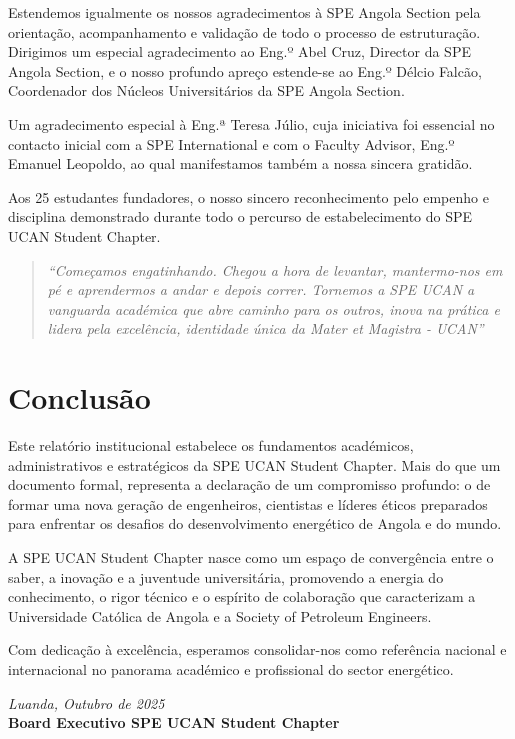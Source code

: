 \documentclass[12pt]{article}
\begin{document}
Estendemos igualmente os nossos agradecimentos à SPE Angola Section pela orientação, acompanhamento e validação de todo o processo de estruturação. Dirigimos um especial agradecimento ao Eng.º Abel Cruz, Director da SPE Angola Section, e o nosso profundo apreço estende-se ao Eng.º Délcio Falcão, Coordenador dos Núcleos Universitários da SPE Angola Section.

Um agradecimento especial à Eng.ª Teresa Júlio, cuja iniciativa foi essencial no contacto inicial com a SPE International e com o Faculty Advisor, Eng.º Emanuel Leopoldo, ao qual manifestamos também a nossa sincera gratidão.

Aos 25 estudantes fundadores, o nosso sincero reconhecimento pelo empenho e disciplina demonstrado durante todo o percurso de estabelecimento do SPE UCAN Student Chapter.

\begin{quote}
\textit{``Começamos engatinhando. Chegou a hora de levantar, mantermo-nos em pé e aprendermos a andar e depois correr. Tornemos a SPE UCAN a vanguarda académica que abre caminho para os outros, inova na prática e lidera pela excelência, identidade única da Mater et Magistra - UCAN''}
\end{quote}

\newpage

\section{Conclusão}

Este relatório institucional estabelece os fundamentos académicos, administrativos e estratégicos da SPE UCAN Student Chapter. Mais do que um documento formal, representa a declaração de um compromisso profundo: o de formar uma nova geração de engenheiros, cientistas e líderes éticos preparados para enfrentar os desafios do desenvolvimento energético de Angola e do mundo.

A SPE UCAN Student Chapter nasce como um espaço de convergência entre o saber, a inovação e a juventude universitária, promovendo a energia do conhecimento, o rigor técnico e o espírito de colaboração que caracterizam a Universidade Católica de Angola e a Society of Petroleum Engineers.

Com dedicação à excelência, esperamos consolidar-nos como referência nacional e internacional no panorama académico e profissional do sector energético.

\begin{flushright}
\textit{Luanda, Outubro de 2025}\\[0.5cm]
\textbf{Board Executivo SPE UCAN Student Chapter}
\end{flushright}
\end{document}
